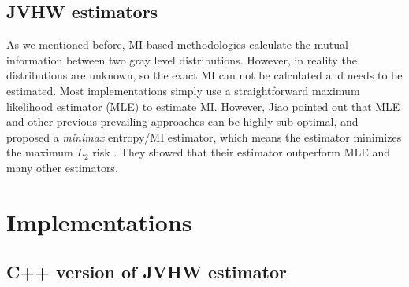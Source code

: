 \documentclass{IEEEtran}
\begin{document}



  \subsection{JVHW estimators}

  As we mentioned before, MI-based methodologies calculate the mutual information between two gray level distributions. However, in reality the distributions are unknown, so the exact MI can not be calculated and needs to be estimated. Most implementations simply use a straightforward maximum likelihood estimator (MLE) to estimate MI. However, Jiao pointed out that MLE and other previous prevailing approaches can be highly sub-optimal, and proposed a \emph{minimax} entropy/MI estimator, which means the estimator minimizes the maximum $L_2$ risk \cite{jiao2015minimax}. They showed that their estimator outperform MLE and many other estimators.

  \section{Implementations}

  \subsection{C++ version of JVHW estimator}
\end{document}
